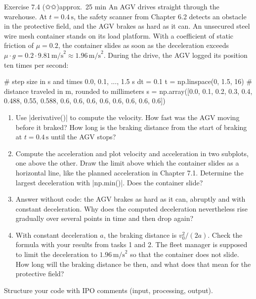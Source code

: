 \documentclass[paper=a4, fontsize=11pt, parskip=half]{scrartcl}
\begin{document}
\clearpage
\begin{aufgabe}{Exercise 7.4 (✩✩)}{approx.\ 25 min}
An AGV drives straight through the warehouse. At $t = 0.4\,\text{s}$, the safety scanner from Chapter 6.2 detects an obstacle in the protective field, and the AGV brakes as hard as it can. An unsecured steel wire mesh container stands on its load platform. With a coefficient of static friction of $\mu = 0.2$, the container slides as soon as the deceleration exceeds $\mu \cdot g = 0.2 \cdot 9.81\,\text{m/s}^2 \approx 1.96\,\text{m/s}^2$. During the drive, the AGV logged its position ten times per second:

\begin{code}
# step size in s and times 0.0, 0.1, ..., 1.5 s
dt = 0.1
t = np.linspace(0, 1.5, 16)
# distance traveled in m, rounded to millimeters
s = np.array([0.0, 0.1, 0.2, 0.3, 0.4, 0.488, 0.55, 0.588,
              0.6, 0.6, 0.6, 0.6, 0.6, 0.6, 0.6, 0.6])
\end{code}

\begin{enumerate}
  \item Use \py|derivative()| to compute the velocity. How fast was the AGV moving before it braked? How long is the braking distance from the start of braking at $t = 0.4\,\text{s}$ until the AGV stops?
  \item Compute the acceleration and plot velocity and acceleration in two subplots, one above the other. Draw the limit above which the container slides as a horizontal line, like the planned acceleration in Chapter 7.1. Determine the largest deceleration with \py|np.min()|. Does the container slide?
  \item Answer without code: the AGV brakes as hard as it can, abruptly and with constant deceleration. Why does the computed deceleration nevertheless rise gradually over several points in time and then drop again?
  \item With constant deceleration $a$, the braking distance is $v_0^2 / (2a)$. Check the formula with your results from tasks 1 and 2. The fleet manager is supposed to limit the deceleration to $1.96\,\text{m/s}^2$ so that the container does not slide. How long will the braking distance be then, and what does that mean for the protective field?
\end{enumerate}

Structure your code with IPO comments (input, processing, output).

\end{aufgabe}
\end{document}
